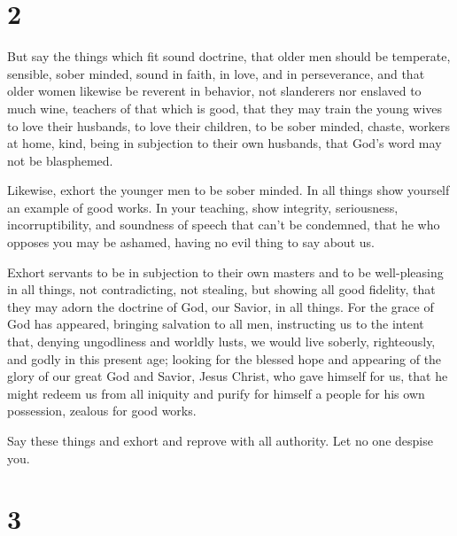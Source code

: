 \hypertarget{section-1}{%
\section{2}\label{section-1}}

 But say the things which fit sound doctrine, 
that older men should be temperate, sensible, sober minded, sound in
faith, in love, and in perseverance,  and that older women
likewise be reverent in behavior, not slanderers nor enslaved to much
wine, teachers of that which is good,  that they may train
the young wives to love their husbands, to love their children,
 to be sober minded, chaste, workers at home, kind, being in
subjection to their own husbands, that God's word may not be blasphemed.

 Likewise, exhort the younger men to be sober minded.
 In all things show yourself an example of good works. In
your teaching, show integrity, seriousness, incorruptibility,
 and soundness of speech that can't be condemned, that he
who opposes you may be ashamed, having no evil thing to say about us.

 Exhort servants to be in subjection to their own masters
and to be well-pleasing in all things, not contradicting, 
not stealing, but showing all good fidelity, that they may adorn the
doctrine of God, our Savior, in all things.  For the grace
of God has appeared, bringing salvation to all men, 
instructing us to the intent that, denying ungodliness and worldly
lusts, we would live soberly, righteously, and godly in this present
age;  looking for the blessed hope and appearing of the
glory of our great God and Savior, Jesus Christ,  who gave
himself for us, that he might redeem us from all iniquity and purify for
himself a people for his own possession, zealous for good works.

 Say these things and exhort and reprove with all
authority. Let no one despise you.

\hypertarget{section-2}{%
\section{3}\label{section-2}}

